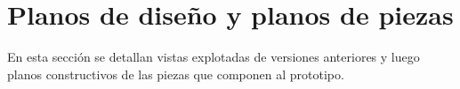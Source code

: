 \section{Planos de diseño y planos de piezas}
En esta sección se detallan vistas explotadas de versiones anteriores 
y luego planos constructivos de las piezas que componen al prototipo.

























% 

